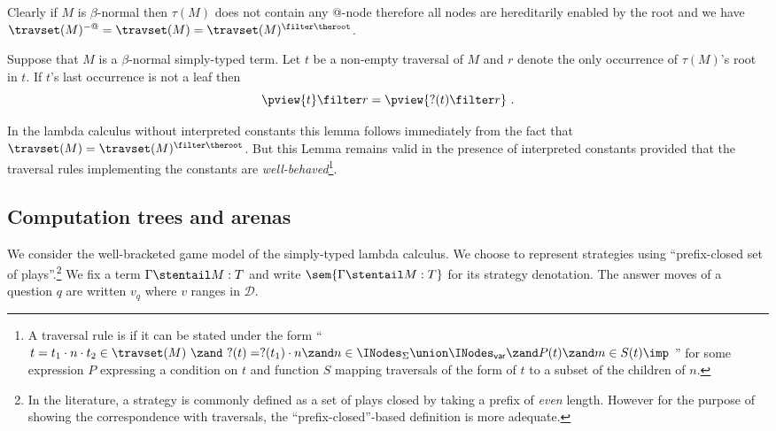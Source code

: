 \begin{remark}
Clearly if $M$ is $\beta$-normal then $\tau(M)$ does not contain any
@-node therefore all nodes are hereditarily enabled by the root and
we have $\travset(M)^{-@} = \travset(M) = \travset(M)^{\filter
\theroot }$.
\end{remark}



\begin{lemma}
\label{lem:betanf_trav_pview_red} Suppose that $M$ is a
$\beta$-normal simply-typed term. Let $t$ be a non-empty traversal
of $M$ and $r$ denote the only occurrence of $\tau(M)$'s root in
$t$. If $t$'s last occurrence is not a leaf then
$$ \pview{t} \filter r = \pview{?(t) \filter  r }\ .$$
\end{lemma}
In the lambda calculus without interpreted constants this lemma
follows immediately from the fact that $\travset(M) =
\travset(M)^{\filter \theroot}$. But this Lemma remains valid in the
presence of interpreted constants provided that the traversal rules
implementing the constants are \emph{well-behaved}\footnote{A
traversal rule is  if it can be stated under
the form ``$t = t_1\cdot n \cdot t_2 \in \travset(M)\ \zand\ ?(t) =
?(t_1) \cdot n \zand n \in \INodes_{\Sigma}\union \INodes_{\sf var} \zand P(t)
\zand m\in S(t) \imp\ $'' for some expression $P$ expressing
a condition on $t$ and function $S$ mapping traversals of the form
of $t$ to a subset of the children of $n$.}.

\subsection{Computation trees and arenas}
We consider the well-bracketed game model of the simply-typed lambda
calculus.  We choose to represent strategies using ``prefix-closed
set of plays''.\footnote{In the literature, a strategy is commonly
defined as a set of plays closed by taking a prefix of \emph{even}
length. However for the purpose of showing the correspondence with
traversals, the ``prefix-closed''-based definition is more
adequate.} We fix a term $\Gamma \stentail M : T$ and write
$\sem{\Gamma \stentail M : T}$ for its strategy denotation. The
answer moves of a question $q$ are written $v_q$ where $v$ ranges in
$\mathcal{D}$.


